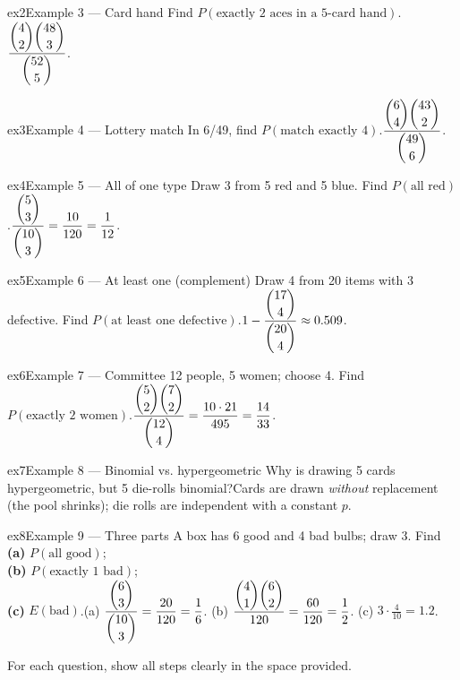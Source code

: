 \documentclass[11pt]{article}
\begin{document}
\begin{example}{ex2}{Example 3 --- Card hand}
Find $P(\text{exactly 2 aces in a 5-card hand})$.\soln $\dfrac{\dbinom{4}{2}\dbinom{48}{3}}{\dbinom{52}{5}}$.
\end{example}

\begin{example}{ex3}{Example 4 --- Lottery match}
In 6/49, find $P(\text{match exactly 4})$.\soln $\dfrac{\dbinom{6}{4}\dbinom{43}{2}}{\dbinom{49}{6}}$.
\end{example}

\begin{example}{ex4}{Example 5 --- All of one type}
Draw 3 from 5 red and 5 blue. Find $P(\text{all red})$.\soln $\dfrac{\dbinom{5}{3}}{\dbinom{10}{3}}=\dfrac{10}{120}=\dfrac{1}{12}$.
\end{example}

\begin{example}{ex5}{Example 6 --- At least one (complement)}
Draw 4 from 20 items with 3 defective. Find $P(\text{at least one defective})$.\soln $1-\dfrac{\dbinom{17}{4}}{\dbinom{20}{4}}\approx0.509$.
\end{example}

\begin{example}{ex6}{Example 7 --- Committee}
12 people, 5 women; choose 4. Find $P(\text{exactly 2 women})$.\soln $\dfrac{\dbinom{5}{2}\dbinom{7}{2}}{\dbinom{12}{4}}=\dfrac{10\cdot21}{495}=\dfrac{14}{33}$.
\end{example}

\begin{example}{ex7}{Example 8 --- Binomial vs. hypergeometric}
Why is drawing 5 cards hypergeometric, but 5 die-rolls binomial?\soln Cards are drawn \emph{without} replacement (the pool shrinks); die rolls are independent with a constant $p$.
\end{example}

\begin{example}{ex8}{Example 9 --- Three parts}
A box has 6 good and 4 bad bulbs; draw 3. Find \\ \textbf{(a)} $P(\text{all good})$; \\ \textbf{(b)} $P(\text{exactly 1 bad})$; \\ \textbf{(c)} $E(\text{bad})$.\soln (a) $\dfrac{\dbinom{6}{3}}{\dbinom{10}{3}}=\dfrac{20}{120}=\dfrac16$. (b) $\dfrac{\dbinom{4}{1}\dbinom{6}{2}}{120}=\dfrac{60}{120}=\dfrac12$. (c) $3\cdot\tfrac{4}{10}=1.2$.
\end{example}

\clearpage
{}
For each question, show all steps clearly in the space provided.
\end{document}
